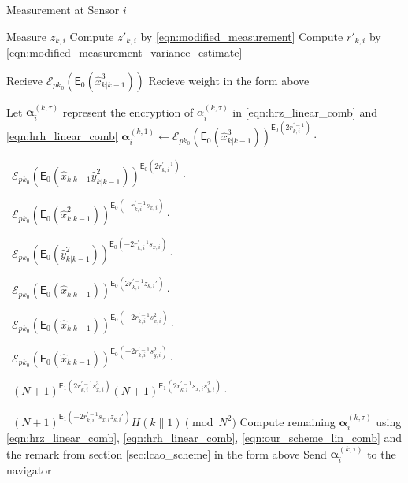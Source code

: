 \documentclass[10pt,letterpaper,oneside,twocolumn,journal]{IEEEtran}
\theoremstyle{definition}
\theoremstyle{definition}
\theoremstyle{remark}
\begin{document}
\begin{algorithm}[htbp]
\caption{Measurement at Sensor $i$}\label{alg:measurement_info}
\begin{algorithmic}[1]

    \State Measure $z_{k,i}$
    \State Compute $z'_{k,i}$ by \eqref{eqn:modified_measurement}
    \State Compute $r'_{k,i}$ by \eqref{eqn:modified_measurement_variance_estimate}

    \State Recieve $\mathcal{E}_{pk_0}(\mathsf{E}_{0}(\hat{x}^3_{k|k-1}))$
        \State Recieve weight in the form above
    \EndFor

    \State Let $\bm{\alpha}_{i}^{(k,\tau)}$ represent the encryption of $\alpha_{i}^{(k,\tau)}$ in \eqref{eqn:hrz_linear_comb} and \eqref{eqn:hrh_linear_comb}
    \State $\bm{\alpha}_{i}^{(k,1)} \gets \mathcal{E}_{pk_0}(\mathsf{E}_{0}(\hat{x}^3_{k|k-1}))^{\mathsf{E}_{0}(2r_{k,i}^{\prime-1})}\cdot$\par
    \ $\mathcal{E}_{pk_0}(\mathsf{E}_{0}(\hat{x}_{k|k-1}\hat{y}^2_{k|k-1}))^{\mathsf{E}_{0}(2r_{k,i}^{\prime-1})}\cdot$\par
    \ $\mathcal{E}_{pk_0}(\mathsf{E}_{0}(\hat{x}^2_{k|k-1}))^{\mathsf{E}_{0}(-r_{k, i}^{\prime-1}s_{x,i})}\cdot$\par
    \ $\mathcal{E}_{pk_0}(\mathsf{E}_{0}(\hat{y}^2_{k|k-1}))^{\mathsf{E}_{0}(-2r_{k, i}^{\prime-1}s_{x,i})}\cdot$\par
    \ $\mathcal{E}_{pk_0}(\mathsf{E}_{0}(\hat{x}_{k|k-1}))^{\mathsf{E}_{0}(2r_{k,i}^{\prime-1}z_{k,i}')}\cdot$\par
    \ $\mathcal{E}_{pk_0}(\mathsf{E}_{0}(\hat{x}_{k|k-1}))^{\mathsf{E}_{0}(-2r_{k,i}^{\prime-1}s_{x,i}^2)}\cdot$\par
    \ $\mathcal{E}_{pk_0}(\mathsf{E}_{0}(\hat{x}_{k|k-1}))^{\mathsf{E}_{0}(-2r_{k,i}^{\prime-1}s_{y,i}^2)}\cdot$\par
    \ $(N+1)^{\mathsf{E}_{1}(2r_{k,i}^{\prime-1}s_{x,i}^3)}
    (N+1)^{\mathsf{E}_{1}(2r_{k,i}^{\prime-1}s_{x,i}s_{y,i}^2)}\cdot$\par
    \ $(N+1)^{\mathsf{E}_{1}(-2r_{k, i}^{\prime-1}s_{x,i}z_{k,i}')}
    H(k\mathbin\|1)\pmod{N^2}$
    \State Compute remaining $\bm{\alpha}_{i}^{(k,\tau)}$ using \eqref{eqn:hrz_linear_comb}, \eqref{eqn:hrh_linear_comb}, \eqref{eqn:our_scheme_lin_comb} and the remark from section \ref{sec:lcao_scheme} in the form above
        \State Send $\bm{\alpha}_{i}^{(k,\tau)}$ to the navigator
    \EndFor
    \EndProcedure
\end{algorithmic}
\end{algorithm}
\end{document}
